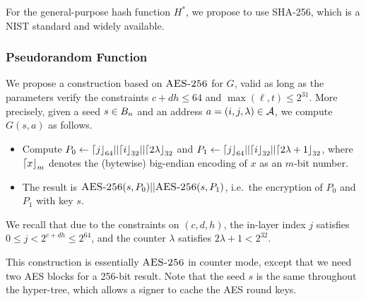 For the general-purpose hash function $H^*$, we propose to use SHA-256, which is a NIST standard and widely available.


\subsubsection{Pseudorandom Function}

We propose a construction based on $\textsc{AES-256}$ for $G$, valid as long as the parameters verify the constraints $c+dh \le 64$ and $\max(\ell,t) \le 2^{31}$.
More precisely, given a seed $s \in B_n$ and an address $a = (i, j, \lambda) \in \mathcal{A}$, we compute $G(s, a)$ as follows.
%
\begin{itemize}
\item Compute $P_0 \gets {\lceil{j}\rfloor}_{64} || {\lceil{i}\rfloor}_{32} || {\lceil{2\lambda}\rfloor}_{32}$ and $P_1 \gets {\lceil{j}\rfloor}_{64} || {\lceil{i}\rfloor}_{32} || {\lceil{2\lambda+1}\rfloor}_{32}$, where ${\lceil{x}\rfloor}_{m}$ denotes the (bytewise) big-endian encoding of $x$ as an $m$-bit number.
\item The result is $\textsc{AES-256}(s, P_0) || \textsc{AES-256}(s, P_1)$, i.e.\ the encryption of $P_0$ and $P_1$ with key $s$.
\end{itemize}
%
We recall that due to the constraints on $(c, d, h)$, the in-layer index $j$ satisfies $0 \le j < 2^{c+dh} \le 2^{64}$, and the counter $\lambda$ satisfies $2\lambda+1 < 2^{32}$.

This construction is essentially $\textsc{AES-256}$ in counter mode, except that we need two AES blocks for a 256-bit result.
Note that the seed $s$ is the same throughout the hyper-tree, which allows a signer to cache the AES round keys.

